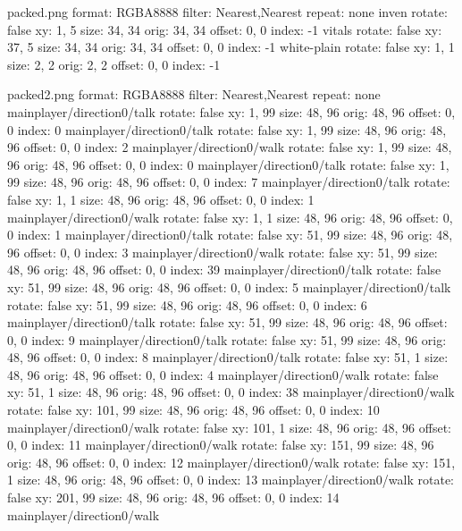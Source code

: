 
packed.png
format: RGBA8888
filter: Nearest,Nearest
repeat: none
inven
  rotate: false
  xy: 1, 5
  size: 34, 34
  orig: 34, 34
  offset: 0, 0
  index: -1
vitals
  rotate: false
  xy: 37, 5
  size: 34, 34
  orig: 34, 34
  offset: 0, 0
  index: -1
white-plain
  rotate: false
  xy: 1, 1
  size: 2, 2
  orig: 2, 2
  offset: 0, 0
  index: -1

packed2.png
format: RGBA8888
filter: Nearest,Nearest
repeat: none
mainplayer/direction0/talk
  rotate: false
  xy: 1, 99
  size: 48, 96
  orig: 48, 96
  offset: 0, 0
  index: 0
mainplayer/direction0/talk
  rotate: false
  xy: 1, 99
  size: 48, 96
  orig: 48, 96
  offset: 0, 0
  index: 2
mainplayer/direction0/walk
  rotate: false
  xy: 1, 99
  size: 48, 96
  orig: 48, 96
  offset: 0, 0
  index: 0
mainplayer/direction0/talk
  rotate: false
  xy: 1, 99
  size: 48, 96
  orig: 48, 96
  offset: 0, 0
  index: 7
mainplayer/direction0/talk
  rotate: false
  xy: 1, 1
  size: 48, 96
  orig: 48, 96
  offset: 0, 0
  index: 1
mainplayer/direction0/walk
  rotate: false
  xy: 1, 1
  size: 48, 96
  orig: 48, 96
  offset: 0, 0
  index: 1
mainplayer/direction0/talk
  rotate: false
  xy: 51, 99
  size: 48, 96
  orig: 48, 96
  offset: 0, 0
  index: 3
mainplayer/direction0/walk
  rotate: false
  xy: 51, 99
  size: 48, 96
  orig: 48, 96
  offset: 0, 0
  index: 39
mainplayer/direction0/talk
  rotate: false
  xy: 51, 99
  size: 48, 96
  orig: 48, 96
  offset: 0, 0
  index: 5
mainplayer/direction0/talk
  rotate: false
  xy: 51, 99
  size: 48, 96
  orig: 48, 96
  offset: 0, 0
  index: 6
mainplayer/direction0/talk
  rotate: false
  xy: 51, 99
  size: 48, 96
  orig: 48, 96
  offset: 0, 0
  index: 9
mainplayer/direction0/talk
  rotate: false
  xy: 51, 99
  size: 48, 96
  orig: 48, 96
  offset: 0, 0
  index: 8
mainplayer/direction0/talk
  rotate: false
  xy: 51, 1
  size: 48, 96
  orig: 48, 96
  offset: 0, 0
  index: 4
mainplayer/direction0/walk
  rotate: false
  xy: 51, 1
  size: 48, 96
  orig: 48, 96
  offset: 0, 0
  index: 38
mainplayer/direction0/walk
  rotate: false
  xy: 101, 99
  size: 48, 96
  orig: 48, 96
  offset: 0, 0
  index: 10
mainplayer/direction0/walk
  rotate: false
  xy: 101, 1
  size: 48, 96
  orig: 48, 96
  offset: 0, 0
  index: 11
mainplayer/direction0/walk
  rotate: false
  xy: 151, 99
  size: 48, 96
  orig: 48, 96
  offset: 0, 0
  index: 12
mainplayer/direction0/walk
  rotate: false
  xy: 151, 1
  size: 48, 96
  orig: 48, 96
  offset: 0, 0
  index: 13
mainplayer/direction0/walk
  rotate: false
  xy: 201, 99
  size: 48, 96
  orig: 48, 96
  offset: 0, 0
  index: 14
mainplayer/direction0/walk

